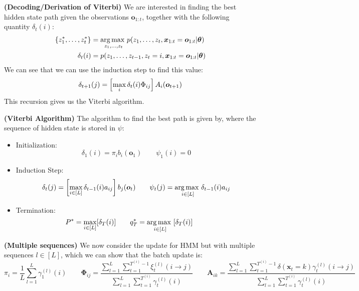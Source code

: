 \begin{remark}{\textbf{(Decoding/Derivation of Viterbi)}}
    We are interested in finding the best hidden state path given the observations $\boldsymbol o_{1:t}$, together with the following quantity $\delta_t(i)$:
    \begin{equation*}
    \begin{aligned}
        \left\{ z_1^*,\dots,z_t^* \right\} &= \underset{z_1, \dots,z_t}{\arg\max \ } p(z_1,\dots,z_t, \boldsymbol x_{1:t} = \boldsymbol o_{1:t} | \boldsymbol \theta) \\
        \delta_t(i) &= p(z_1,\dots,z_{t-1}, z_t=i, \boldsymbol x_{1:t} = \boldsymbol o_{1:t} | \boldsymbol \theta)
    \end{aligned}
    \end{equation*}
    We can see that we can use the induction step to find this value:
    \begin{equation*}
        \delta_{t+1}(j) = \left[ \max_i \delta_t(i)\Phi_{ij} \right]A_i(\boldsymbol o_{t+1})
    \end{equation*}
    This recursion gives us the Viterbi algorithm.
\end{remark}

\begin{definition}{\textbf{(Viterbi Algorithm)}}
    The algorithm to find the best path is given by, where the sequence of hidden state is stored in $\psi$:
    \begin{itemize}
        \item Initialization:
        \begin{equation*}
            \delta_1(i) = \pi_ib_i(\boldsymbol o_{1}) \qquad \psi_1(i) = 0
        \end{equation*}
        \item Induction Step:
        \begin{equation*}
            \delta_t(j) = \left[ \max_{i \in [L]}\delta_{t-1}(i)a_{ij} \right]b_j(\boldsymbol o_t) \qquad \psi_t(j) = \underset{i \in [L]}{\arg\max \ }\delta_{t-1}(i)a_{ij}
        \end{equation*}
        \item Termination:
        \begin{equation*}
            P^* = \max_{i\in[L]} [\delta_T(i)] \qquad
            q^*_T = \underset{i\in[L]}{\arg\max \ } [\delta_T(i)] \qquad
        \end{equation*}
    \end{itemize}
\end{definition}

\begin{remark}{\textbf{(Multiple sequences)}}
    We now consider the update for HMM but with multiple sequences $l \in [L]$, which we can show that the batch update is:
    \begin{equation*}
        \pi_i = \frac{1}{L}\sum^L_{l=1}\gamma_1^{(l)}(i) 
        \qquad \boldsymbol \Phi_{ij} = \frac{\sum^L_{l=1}\sum^{T^{(i)}-1}_{t=1} \xi_t^{(l)}(i\rightarrow j)}{\sum^L_{l=1} \sum^{T^{(i)}}_{t=1}\gamma_t^{(l)}(i)} \qquad
        \boldsymbol A_{ik} = \frac{\sum^L_{l=1}\sum^{T^{(i)}-1}_{t=1} \delta(\boldsymbol x_t = k) \gamma_t^{(l)}(i\rightarrow j)}{\sum^L_{l=1} \sum^{T^{(i)}}_{t=1}\gamma_t^{(l)}(i)} 
    \end{equation*}
\end{remark}
